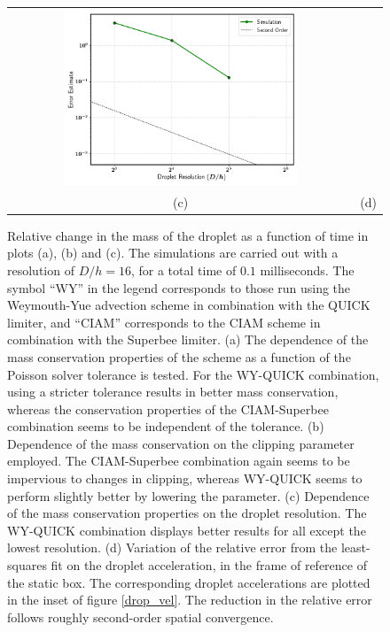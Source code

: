\begin{figure}
\begin{center}
\begin{tabular}{cc}
\hspace{-0.2cm}%
\includegraphics[width=0.7\textwidth]{plots/raindrop/new.png} \\ 
\hspace{-0.2cm}%
(c) & (d)
\end{tabular}
\end{center}
\caption{Relative change in the mass of the droplet 
as a function of time in plots (a), (b) and (c). 
The simulations are carried out with a resolution of $D/h = 16$, 
for a total time of $0.1$ milliseconds. 
The symbol ``WY'' in the legend corresponds to those run using 
the Weymouth-Yue advection scheme in combination with the QUICK limiter, 
and ``CIAM'' corresponds to the CIAM scheme in combination with the Superbee limiter. 
(a) The dependence of the mass conservation properties of 
the scheme as a function of the Poisson solver tolerance is tested. 
For the WY-QUICK combination, using a stricter tolerance results 
in better mass conservation, whereas the conservation properties of the 
CIAM-Superbee combination seems to be independent of the tolerance.
(b) Dependence of the mass conservation on the clipping parameter employed. 
The CIAM-Superbee combination again seems to be impervious to changes in clipping, 
whereas WY-QUICK seems to perform slightly better by lowering the parameter.
(c) Dependence of the mass conservation properties on the droplet resolution. 
The WY-QUICK combination displays better results for all except the lowest resolution.   
(d) Variation of the relative error from the least-squares fit on the droplet acceleration, 
in the frame of reference of the static box. 
The corresponding droplet accelerations are plotted in the inset of figure \ref{drop_vel}. 
The reduction in the relative error follows roughly second-order spatial convergence.}
\label{mass_conv}
\end{figure}


